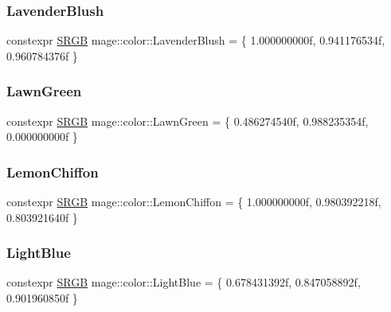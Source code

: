 \hypertarget{namespacemage_1_1color_a90a4b5ea124bee04590c85bfdd9c2e35}{}\label{namespacemage_1_1color_a90a4b5ea124bee04590c85bfdd9c2e35} 
\subsubsection{\texorpdfstring{Lavender\+Blush}{LavenderBlush}}
{\footnotesize\ttfamily constexpr \hyperlink{structmage_1_1_s_r_g_b}{S\+R\+GB} mage\+::color\+::\+Lavender\+Blush = \{ 1.\+000000000f, 0.\+941176534f, 0.\+960784376f \}}

\hypertarget{namespacemage_1_1color_a0bb99b63d697eb437075b3ec801288dc}{}\label{namespacemage_1_1color_a0bb99b63d697eb437075b3ec801288dc} 
\subsubsection{\texorpdfstring{Lawn\+Green}{LawnGreen}}
{\footnotesize\ttfamily constexpr \hyperlink{structmage_1_1_s_r_g_b}{S\+R\+GB} mage\+::color\+::\+Lawn\+Green = \{ 0.\+486274540f, 0.\+988235354f, 0.\+000000000f \}}

\hypertarget{namespacemage_1_1color_a74c87d2cae011f5cb6da406693bef936}{}\label{namespacemage_1_1color_a74c87d2cae011f5cb6da406693bef936} 
\subsubsection{\texorpdfstring{Lemon\+Chiffon}{LemonChiffon}}
{\footnotesize\ttfamily constexpr \hyperlink{structmage_1_1_s_r_g_b}{S\+R\+GB} mage\+::color\+::\+Lemon\+Chiffon = \{ 1.\+000000000f, 0.\+980392218f, 0.\+803921640f \}}

\hypertarget{namespacemage_1_1color_acd9eefb90a39e16c44165719acfae942}{}\label{namespacemage_1_1color_acd9eefb90a39e16c44165719acfae942} 
\subsubsection{\texorpdfstring{Light\+Blue}{LightBlue}}
{\footnotesize\ttfamily constexpr \hyperlink{structmage_1_1_s_r_g_b}{S\+R\+GB} mage\+::color\+::\+Light\+Blue = \{ 0.\+678431392f, 0.\+847058892f, 0.\+901960850f \}}


